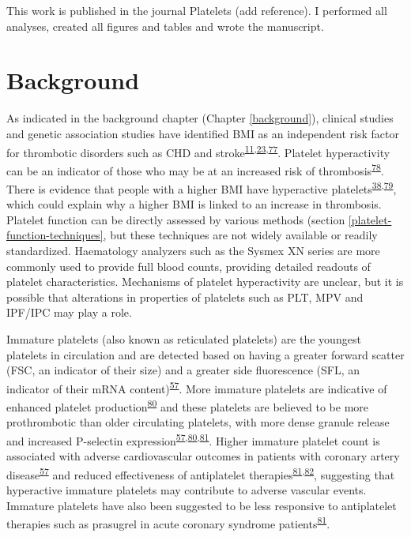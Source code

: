\documentclass[11pt,twoside]{bristolthesis}
\begin{document}
This work is published in the journal Platelets (add reference). I performed all analyses, created all figures and tables and wrote the manuscript.

\hypertarget{background-1}{%
\section{Background}\label{background-1}}

As indicated in the background chapter (Chapter \ref{background}), clinical studies and genetic association studies have identified BMI as an independent risk factor for thrombotic disorders such as CHD and stroke\textsuperscript{\protect\hyperlink{ref-Nordestgaard2012}{11},\protect\hyperlink{ref-Dale2017}{23},\protect\hyperlink{ref-Wolk2003a}{77}}. Platelet hyperactivity can be an indicator of those who may be at an increased risk of thrombosis\textsuperscript{\protect\hyperlink{ref-Puurunen2018}{78}}. There is evidence that people with a higher BMI have hyperactive platelets\textsuperscript{\protect\hyperlink{ref-Nardin2015}{38},\protect\hyperlink{ref-Barrachina2019}{79}}, which could explain why a higher BMI is linked to an increase in thrombosis. Platelet function can be directly assessed by various methods (section \ref{platelet-function-techniques}, but these techniques are not widely available or readily standardized. Haematology analyzers such as the Sysmex XN series are more commonly used to provide full blood counts, providing detailed readouts of platelet characteristics. Mechanisms of platelet hyperactivity are unclear, but it is possible that alterations in properties of platelets such as PLT, MPV and IPF/IPC may play a role.

Immature platelets (also known as reticulated platelets) are the youngest platelets in circulation and are detected based on having a greater forward scatter (FSC, an indicator of their size) and a greater side fluorescence (SFL, an indicator of their mRNA content)\textsuperscript{\protect\hyperlink{ref-Ibrahim2014}{57}}. More immature platelets are indicative of enhanced platelet production\textsuperscript{\protect\hyperlink{ref-Lev2016a}{80}} and these platelets are believed to be more prothrombotic than older circulating platelets, with more dense granule release and increased P-selectin expression\textsuperscript{\protect\hyperlink{ref-Ibrahim2014}{57},\protect\hyperlink{ref-Lev2016a}{80},\protect\hyperlink{ref-Bernlochner2015a}{81}}. Higher immature platelet count is associated with adverse cardiovascular outcomes in patients with coronary artery disease\textsuperscript{\protect\hyperlink{ref-Ibrahim2014}{57}} and reduced effectiveness of antiplatelet therapies\textsuperscript{\protect\hyperlink{ref-Bernlochner2015a}{81},\protect\hyperlink{ref-Ibrahim2012}{82}}, suggesting that hyperactive immature platelets may contribute to adverse vascular events. Immature platelets have also been suggested to be less responsive to antiplatelet therapies such as prasugrel in acute coronary syndrome patients\textsuperscript{\protect\hyperlink{ref-Bernlochner2015a}{81}}.
\end{document}
